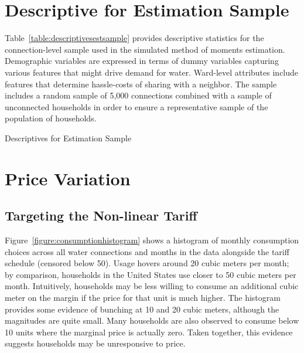 \documentclass[12pt]{article}
\begin{document}
\begin{appendices}
\section{Descriptive for Estimation Sample}\label{appendix:descriptivesest}

Table~\ref{table:descriptivesestsample} provides descriptive statistics for the connection-level sample used in the simulated method of moments estimation.  Demographic variables are expressed in terms of dummy variables capturing various features that might drive demand for water.  Ward-level attributes include features that determine hassle-costs of sharing with a neighbor.  The sample includes a random sample of 5,000 connections combined with a sample of unconnected households in order to ensure a representative sample of the population of households.

\begin{table}
\caption{Descriptives for Estimation Sample}\label{table:descriptivesestsample}
\begin{center}

\end{center}
\end{table}



\section{Price Variation}\label{appendix:pricevariation}

\subsection{Targeting the Non-linear Tariff}

Figure~\ref{figure:consumptionhistogram} shows a histogram of monthly consumption choices across all water connections and months in the data alongside the tariff schedule (censored below 50).  Usage hovers around 20 cubic meters per month; by comparison, households in the United States use closer to 50 cubic meters per month.  Intuitively, households may be less willing to consume an additional cubic meter on the margin if the price for that unit is much higher.  The histogram provides some evidence of bunching at 10 and 20 cubic meters, although the magnitudes are quite small.  Many households are also observed to consume below 10 units where the marginal price is actually zero.  Taken together, this evidence suggests households may be unresponsive to price.


\end{appendices}
\end{document}
